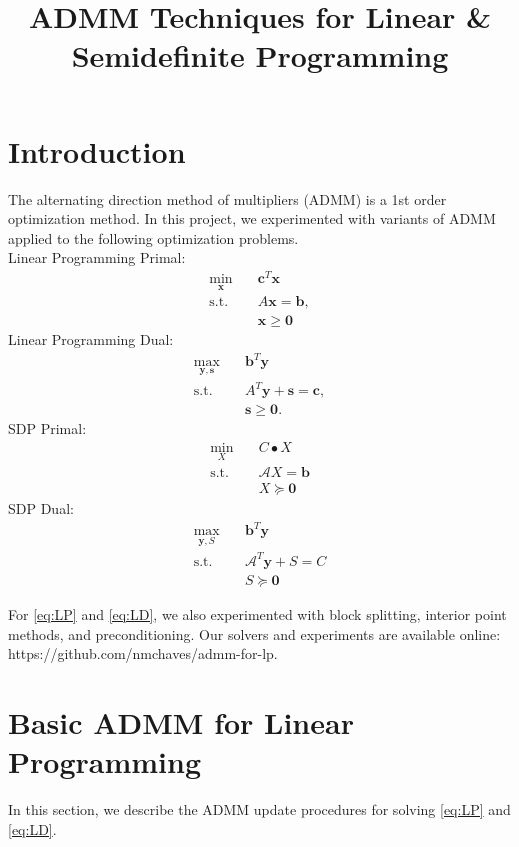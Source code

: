 \documentclass{article}
\title{ADMM Techniques for Linear \& Semidefinite Programming }
\author{\studentname}
\begin{document}
\maketitle

\section{Introduction}
The alternating direction method of multipliers (ADMM) is a 1st order optimization method. In this project, we experimented with variants of ADMM applied to the following optimization problems. \\
Linear Programming Primal:
\begin{align}
\min_{\mathbf{x}} &\quad \mathbf{c}^T\mathbf{x} \tag{LP}\label{eq:LP} \\
\text{s.t.} &\quad  A \mathbf{x} = \mathbf{b},  \nonumber \\
&\quad \mathbf{x} \geq \mathbf{0} \nonumber 
\end{align}
Linear Programming Dual:
\begin{align}
\max_{\mathbf{y}, \mathbf{s}} &\quad \mathbf{b}^T\mathbf{y}  \tag{LD}\label{eq:LD} \\
\text{s.t.} &\quad  A^T \mathbf{y}  + \mathbf{s} = \mathbf{c},  \nonumber \\
&\quad \mathbf{s} \geq \mathbf{0} \nonumber.
\end{align}
SDP Primal:
\begin{align}
\min_{X} &\quad C\bullet X  \tag{SDP}\label{eq:SDP} \\
\text{s.t.} &\quad \mathcal{A}X=\mathbf{b} \nonumber \\
&\quad X\succeq \mathbf{0} \nonumber
\end{align}
SDP Dual:
\begin{align}
\max_{\mathbf{y},S} &\quad \mathbf{b}^{T}\mathbf{y} \tag{SDD}\label{eq:SDD}  \\
\text{s.t.} &\quad \mathcal{A}^{T}\mathbf{y}+S=C \nonumber \\
&\quad S\succeq\mathbf{0} \nonumber
\end{align}

For \eqref{eq:LP} and \eqref{eq:LD}, we also experimented with block splitting, interior point methods, and preconditioning. Our solvers and experiments are available online: https://github.com/nmchaves/admm-for-lp. 

\section{Basic ADMM for Linear Programming}
In this section, we describe the ADMM update procedures for solving \eqref{eq:LP} and \eqref{eq:LD}.
\end{document}
